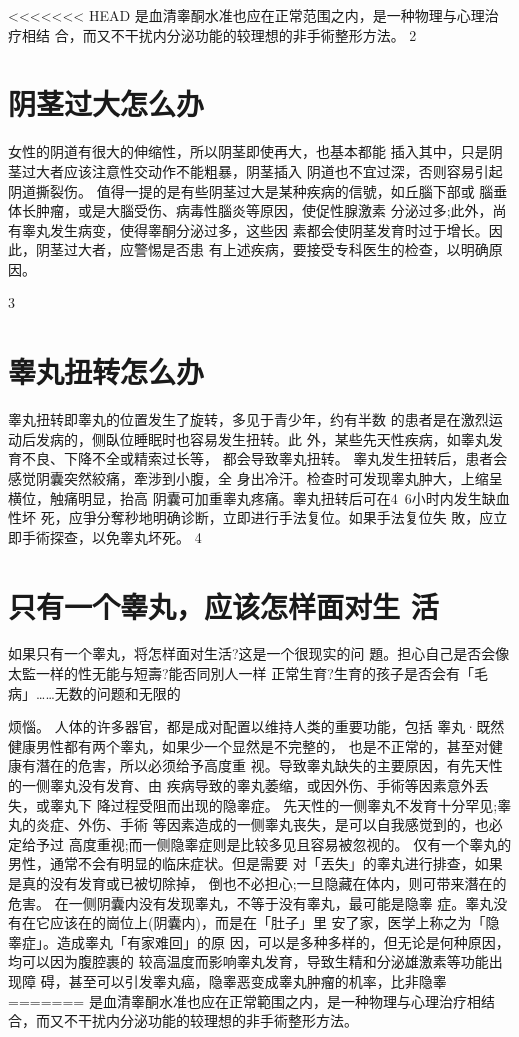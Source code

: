 \documentclass[12pt,UTF8]{ctexbook}
\begin{document}
<<<<<<< HEAD
是血清睾酮水准也应在正常范围之内，是一种物理与心理治疗相结
合，而又不干扰内分泌功能的较理想的非手術整形方法。
2
\section{阴茎过大怎么办}
女性的阴道有很大的伸缩性，所以阴茎即使再大，也基本都能
插入其中，只是阴茎过大者应该注意性交动作不能粗暴，阴茎插入
阴道也不宜过深，否则容易引起阴道撕裂伤。
值得一提的是有些阴茎过大是某种疾病的信號，如丘腦下部或
腦垂体长肿瘤，或是大腦受伤、病毒性腦炎等原因，使促性腺激素
分泌过多;此外，尚有睾丸发生病变，使得睾酮分泌过多，这些因
素都会使阴茎发育时过于增长。因此，阴茎过大者，应警惕是否患
有上述疾病，要接受专科医生的检查，以明确原因。

3
\section{睾丸扭转怎么办}
睾丸扭转即睾丸的位置发生了旋转，多见于青少年，约有半数
的患者是在激烈运动后发病的，侧臥位睡眠时也容易发生扭转。此
外，某些先天性疾病，如睾丸发育不良、下降不全或精索过长等，
都会导致睾丸扭转。
睾丸发生扭转后，患者会感觉阴囊突然絞痛，牽涉到小腹，全
身出冷汗。检查时可发现睾丸肿大，上缩呈横位，触痛明显，抬高
阴囊可加重睾丸疼痛。睾丸扭转后可在4~6小时内发生缺血性坏
死，应爭分奪秒地明确诊断，立即进行手法复位。如果手法复位失
敗，应立即手術探查，以免睾丸坏死。
4
\section{只有一个睾丸，应该怎样面对生
活}
如果只有一个睾丸，将怎样面对生活?这是一个很现实的问
題。担心自己是否会像太監一样的性无能与短壽?能否同別人一样
正常生育?生育的孩子是否会有「毛病」……无数的问题和无限的

烦惱。
人体的许多器官，都是成对配置以维持人类的重要功能，包括
睾丸·既然健康男性都有两个睾丸，如果少一个显然是不完整的，
也是不正常的，甚至对健康有潛在的危害，所以必须给予高度重
视。导致睾丸缺失的主要原因，有先天性的一侧睾丸没有发育、由
疾病导致的睾丸萎缩，或因外伤、手術等因素意外丢失，或睾丸下
降过程受阻而出现的隐睾症。
先天性的一侧睾丸不发育十分罕见;睾丸的炎症、外伤、手術
等因素造成的一侧睾丸丧失，是可以自我感觉到的，也必定给予过
高度重视;而一侧隐睾症则是比较多见且容易被忽视的。
仅有一个睾丸的男性，通常不会有明显的临床症状。但是需要
对「丟失」的睾丸进行排查，如果是真的没有发育或已被切除掉，
倒也不必担心;一旦隐藏在体内，则可带来潛在的危害。
在一侧阴囊内没有发现睾丸，不等于没有睾丸，最可能是隐睾
症。睾丸没有在它应该在的崗位上(阴囊内)，而是在「肚子」里
安了家，医学上称之为「隐睾症」。造成睾丸「有家难回」的原
因，可以是多种多样的，但无论是何种原因，均可以因为腹腔裹的
较高温度而影响睾丸发育，导致生精和分泌雄激素等功能出现障
碍，甚至可以引发睾丸癌，隐睾恶变成睾丸肿瘤的机率，比非隐睾
=======
是血清睾酮水准也应在正常範围之内，是一种物理与心理治疗相结
合，而又不干扰内分泌功能的较理想的非手術整形方法。
\end{document}
